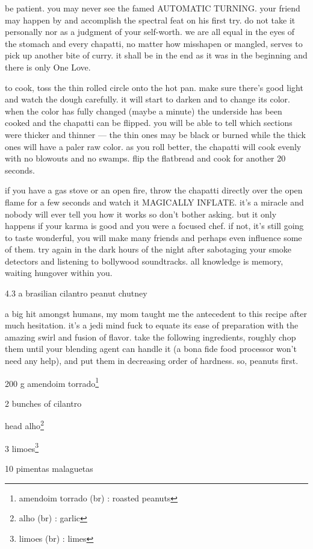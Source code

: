 be patient. you may never see the famed AUTOMATIC TURNING. your friend may happen by and accomplish the spectral feat on his first try. do not take it personally nor as a judgment of your self-worth. we are all equal in the eyes of the stomach and every chapatti, no matter how misshapen or mangled, serves to pick up another bite of curry. it shall be in the end as it was in the beginning and there is only One Love.

to cook, toss the thin rolled circle onto the hot pan. make sure there's good light and watch the dough carefully. it will start to darken and to change its color. when the color has fully changed (maybe a minute) the underside has been cooked and the chapatti can be flipped. you will be able to tell which sections were thicker and thinner --- the thin ones may be black or burned while the thick ones will have a paler raw color. as you roll better, the chapatti will cook evenly with no blowouts and no swamps. flip the flatbread and cook for another 20 seconds.

if you have a gas stove or an open fire, throw the chapatti directly over the open flame for a few seconds and watch it MAGICALLY INFLATE. it's a miracle and nobody will ever tell you how it works so don't bother asking. but it only happens if your karma is good and you were a focused chef. if not, it's still going to taste wonderful, you will make many friends and perhaps even influence some of them. try again in the dark hours of the night after sabotaging your smoke detectors and listening to bollywood soundtracks. all knowledge is memory, waiting hungover within you.


4.3  a brasilian cilantro peanut chutney

a big hit amongst humans, my mom taught me the antecedent to this recipe after much hesitation. it's a jedi mind fuck to equate its ease of preparation with the amazing swirl and fusion of flavor. take the following ingredients, roughly chop them until your blending agent can handle it (a bona fide food processor won't need any help), and put them in decreasing order of hardness. so, peanuts first.

\begin{ingredients}
  \item 200 g amendoim torrado\footnote{amendoim torrado (br) :
  roasted peanuts}
  \item 2 bunches of cilantro
  \item \onehalf head alho\footnote{alho (br) : garlic}
  \item 3 limoes\footnote{limoes (br) : limes}
  \item 10 pimentas malaguetas
\end{ingredients}

